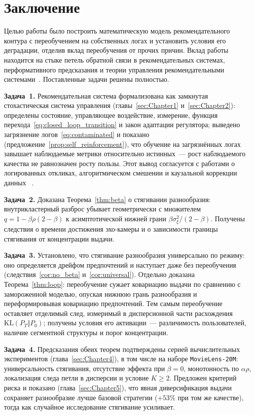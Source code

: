 \section{Заключение}
\label{sec:Chapter6} 

Целью работы было построить математическую модель рекомендательного контура с
переобучением на собственных логах и установить условия его деградации, отделив
вклад переобучения от прочих причин. Вклад работы находится на стыке петель
обратной связи в рекомендательных системах, перформативного предсказания и
теории управления рекомендательными системами~\cite{krauth2022, perdomo2020,
depasquale2026controlSystems}. Поставленные задачи решены полностью.

\textbf{Задача~1.} Рекомендательная система формализована как замкнутая
стохастическая система управления (главы~\ref{sec:Chapter1}
и~\ref{sec:Chapter2}): определены состояние, управляющее воздействие, измерение,
функция перехода~\eqref{eq:closed_loop_transition} и закон адаптации регулятора;
выведено загрязнение логов~\eqref{eq:contaminated} и показано
(предложение~\ref{prop:self_reinforcement}), что обучение на загрязнённых логах
завышает наблюдаемые метрики относительно истинных~--- рост наблюдаемого качества
не равнозначен росту пользы. Этот вывод согласуется с работами о логированных
откликах, алгоритмическом смешении и каузальной коррекции данных
~\cite{sinha2016, chaney2018, bottou2013}.

\textbf{Задача~2.} Доказана Теорема~\ref{thm:beta} о стягивании разнообразия:
внутрикластерный разброс убывает геометрически с множителем $q=1-\beta\rho(2-\beta)$
к асимптотической нижней грани $\beta\sigma_\xi^2/(2-\beta)$. Получены следствия о
времени достижения эхо-камеры и о зависимости границы стягивания от концентрации
выдачи.

\textbf{Задача~3.} Установлено, что стягивание разнообразия универсально по
режиму: оно определяется дрейфом предпочтений и наступает даже без переобучения
(следствия~\ref{cor:no_beta} и~\ref{cor:universal}). Отдельно доказана
Теорема~\ref{thm:loop}: переобучение сужает ковариацию выдачи по сравнению с
замороженной моделью, опуская нижнюю грань разнообразия и переформировывая
ковариацию предпочтений. Тем самым переобучение оставляет отделимый след,
измеримый в дисперсионной части расхождения $\mathrm{KL}(P_T\Vert P_0)$; получены
условия его активации~--- различимость пользователей, наличие сегментной
структуры и порог концентрации.

\textbf{Задача~4.} Предсказания обеих теорем подтверждены серией вычислительных
экспериментов (глава~\ref{sec:Chapter4}), в том числе на наборе
\texttt{MovieLens-20M}: универсальность стягивания, отсутствие эффекта при
$\beta=0$, монотонность по $\alpha\rho$, локализация следа петли в дисперсии и
условие $K\ge2$. Предложен критерий риска и показано (глава~\ref{sec:Chapter5}),
что явная диверсификация выдачи сохраняет разнообразие лучше базовой стратегии
($+53\%$ при том же качестве), тогда как случайное исследование стягивание
усиливает.

